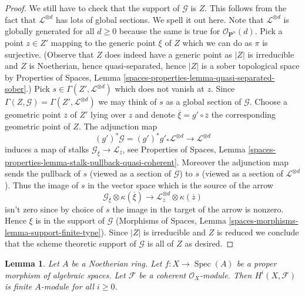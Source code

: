 \documentclass{stacks-project}
\theoremstyle{plain}
\newtheorem{lemma}[subsection]{Lemma}
\theoremstyle{definition}
\theoremstyle{remark}
\numberwithin{equation}{subsection}
\def\Spec{\mathop{\mathrm{Spec}}}
\begin{document}
\begin{proof}
\medskip\noindent
We still have to check that the support of $\mathcal{G}$ is $Z$.
This follows from the fact that $\mathcal{L}^{\otimes d}$ has
lots of global sections. We spell it out here.
Note that $\mathcal{L}^{\otimes d}$ is globally generated for all $d \geq 0$
because the same is true for $\mathcal{O}_{\mathbf{P}^n}(d)$.
Pick a point $z \in Z'$ mapping to the generic point $\xi$ of $Z$
which we can do as $\pi$ is surjective.
(Observe that $Z$ does indeed have a generic point as $|Z|$ is irreducible
and $Z$ is Noetherian, hence quasi-separated, hence $|Z|$ is a sober
topological space by
Properties of Spaces, Lemma
\ref{spaces-properties-lemma-quasi-separated-sober}.)
Pick $s \in \Gamma(Z', \mathcal{L}^{\otimes d})$ which does not vanish at $z$.
Since $\Gamma(Z, \mathcal{G}) = \Gamma(Z', \mathcal{L}^{\otimes d})$
we may think of $s$ as a global section of $\mathcal{G}$.
Choose a geometric point $\overline{z}$ of $Z'$ lying over $z$
and denote $\overline{\xi} = g' \circ \overline{z}$
the corresponding geometric point of $Z$. The adjunction map
$$
(g')^*\mathcal{G} =
(g')^*g'_*\mathcal{L}^{\otimes d} \longrightarrow \mathcal{L}^{\otimes d}
$$
induces a map of stalks
$\mathcal{G}_{\overline{\xi}} \to \mathcal{L}_{\overline{z}}$, see
Properties of Spaces, Lemma
\ref{spaces-properties-lemma-stalk-pullback-quasi-coherent}.
Moreover the adjunction map sends the pullback of $s$ (viewed as a section
of $\mathcal{G}$) to $s$ (viewed as a section of $\mathcal{L}^{\otimes d}$).
Thus the image of $s$ in the vector space which is the source of the arrow
$$
\mathcal{G}_{\overline{\xi}} \otimes \kappa(\overline{\xi})
\longrightarrow
\mathcal{L}^{\otimes d}_{\overline{z}} \otimes \kappa(\overline{z})
$$
isn't zero since by choice of $s$ the image in the target of the arrow
is nonzero. Hence $\xi$ is in the support of $\mathcal{G}$
(Morphisms of Spaces, Lemma \ref{spaces-morphisms-lemma-support-finite-type}).
Since $|Z|$ is irreducible and $Z$ is reduced we conclude that
the scheme theoretic support of $\mathcal{G}$ is all of $Z$ as desired.
\end{proof}

\begin{lemma}
\label{lemma-proper-over-affine-cohomology-finite}
Let $A$ be a Noetherian ring.
Let $f : X \to \Spec(A)$ be a proper morphism of algebraic spaces.
Let $\mathcal{F}$ be a coherent $\mathcal{O}_X$-module.
Then $H^i(X, \mathcal{F})$ is finite $A$-module for all $i \geq 0$.
\end{lemma}
\end{document}
